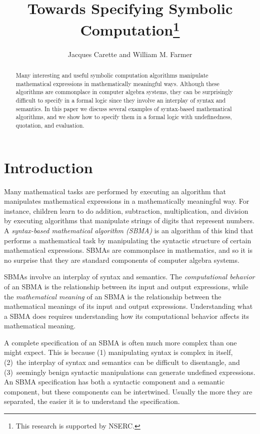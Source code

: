 \documentclass[fleqn]{llncs}
\title{Towards Specifying Symbolic Computation\thanks{This research is
    supported by NSERC.}}
\author{Jacques Carette and William M. Farmer}
\institute{%
Computing and Software, McMaster University, Canada\\
\url{http://www.cas.mcmaster.ca/~carette}\\
\url{http://imps.mcmaster.ca/wmfarmer}\\[1.5ex]
4 April 2019
}
\begin{document}
\maketitle

\begin{abstract}
\bsp
Many interesting and useful symbolic computation algorithms manipulate
mathematical expressions in mathematically meaningful ways.  Although
these algorithms are commonplace in computer algebra systems, they can
be surprisingly difficult to specify in a formal logic since they
involve an interplay of syntax and semantics.  In this paper we
discuss several examples of syntax-based mathematical algorithms, and
we show how to specify them in a formal logic with undefinedness,
quotation, and evaluation.
\esp
\end{abstract}

\iffalse

\textbf{Keywords:} Symbolic computation, computer algebra systems,
reasoning about syntax, undefinedness, quotation and evaluation.

\fi

\section{Introduction}

Many mathematical tasks are performed by executing an algorithm that
manipulates mathematical expressions in a mathematically meaningful
way.  For instance, children learn to do addition, subtraction,
multiplication, and division by executing algorithms that manipulate
strings of digits that represent numbers.  A \emph{syntax-based
  mathematical algorithm (SBMA)} is an algorithm of this kind that
performs a mathematical task by manipulating the syntactic structure
of certain mathematical expressions.  SBMAs are commonplace in
mathematics, and so it is no surprise that they are standard
components of computer algebra systems.

SBMAs involve an interplay of syntax and semantics.  The
\emph{computational behavior} of an SBMA is the relationship between
its input and output expressions, while the \emph{mathematical
  meaning} of an SBMA is the relationship between the mathematical
meanings of its input and output expressions.  Understanding what a
SBMA does requires understanding how its computational behavior
affects its mathematical meaning.

A complete specification of an SBMA is often much more complex than
one might expect.  This is because (1) manipulating syntax is complex
in itself, (2)~the interplay of syntax and semantics can be difficult
to disentangle, and (3)~seemingly benign syntactic
manipulations can generate undefined expressions.  An SBMA
specification has both a syntactic component and a semantic component,
but these components can be intertwined.  Usually the more they are
separated, the easier it is to understand the specification.
\end{document}
